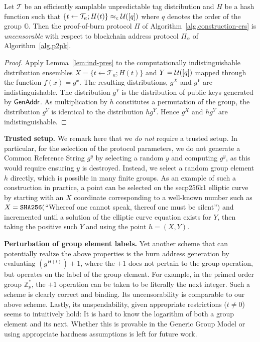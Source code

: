 \begin{theorem}[Uncensorability]
  Let $\mathcal{T}$ be an efficiently samplable unpredictable tag distribution and $H$ be a hash function such that $\{t \gets \mathcal{T}_\kappa; H(t)\} \approx_c \mathcal{U}([q])$ where $q$ denotes the order of the group $\mathbb{G}$. Then the proof-of-burn protocol $\Pi$ of Algorithm~\ref{alg.construction-crs} is \emph{uncensorable} with respect to blockchain address protocol $\Pi_\alpha$ of Algorithm~\ref{alg.p2pk}.
\end{theorem}
\begin{proof}
  Apply Lemma~\ref{lem:ind-pres} to the computationally indistinguishable distribution ensembles $X = \{t \gets \mathcal{T}_\kappa; H(t)\}$ and $Y = \mathcal{U}([q])$ mapped through the function $f(x) = g^x$. The resulting distributions, $g^X$ and $g^Y$ are
  indistinguishable. The distribution $g^Y$ is the distribution of public keys
  generated by $\mathsf{GenAddr}$. As multiplication by $h$ constitutes a permutation
  of the group, the distribution $g^Y$ is identical to the distribution $h g^Y$.
  Hence $g^X$ and $h g^Y$ are indistinguishable.
\end{proof}

\noindent
\textbf{Trusted setup.}
We remark here that we \emph{do not} require a trusted setup. In particular, for the selection of the protocol parameters, we do not generate a Common Reference String $g^y$ by selecting a random $y$ and computing $g^y$, as this would require ensuring $y$ is destroyed. Instead, we select a random group element $h$ directly, which is possible in many finite groups. As an example of such a construction in practice, a point can be selected on the secp256k1 elliptic curve by starting with an $X$ coordinate corresponding to a well-known number such as $X = \texttt{SHA256}($``Whereof one cannot speak, thereof one must be silent''$)$ and incremented until a solution of the elliptic curve equation exists for $Y$, then taking the positive such $Y$ and using the point $h = (X, Y)$.

\noindent
\textbf{Perturbation of group element labels.}
Yet another scheme that can potentially realize the above properties is the burn
address generation by evaluating $(g^{H(t)}) + 1$, where the $+1$ does not pertain to
the group operation, but operates on the label of the group element. For
example, in the primed order group $\mathbb{Z}_p^*$, the $+1$ operation can be taken to be literally
the next integer. Such a scheme is clearly correct and binding. Its
uncensorability is comparable to our above scheme. Lastly, its unspendability,
given appropriate restrictions ($t \neq 0$) seems to intuitively hold: It is
hard to know the logarithm of both a group element and its next. Whether this is
provable in the Generic Group Model or using appropriate hardness assumptions is
left for future work.
